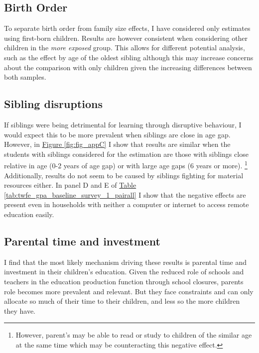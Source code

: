\subsection{Birth Order}

To separate birth order from family size effects, I have considered only estimates using first-born children. Results are however consistent when considering other children in the \textit{more exposed} group. This allows for different potential analysis, such as the effect by age of the oldest sibling although this may increase concerns about the comparison with only children given the increasing differences between both samples.

\subsection{Sibling disruptions}

If siblings were being detrimental for learning through disruptive behaviour, I would expect this to be more prevalent when siblings are close in age gap. However, in \hyperref[fig:fig_appC]{Figure \ref{fig:fig_appC}} I show that results are similar when the students with siblings considered for the estimation are those with siblings close relative in age (0-2 years of age gap) or with large age gaps (6 years or more). \footnote{However, parent's may be able to read or study to children of the similar age at the same time which may be counteracting this negative effect.} Additionally, results do not seem to be caused by siblings fighting for material resources either. In panel D and E of \hyperref[tab:twfe_gpa_baseline_survey_1_pairall]{Table \ref{tab:twfe_gpa_baseline_survey_1_pairall}} I show that the negative effects are present even in households with neither a computer or internet to access remote education easily.





\subsection{Parental time and investment}

I find that the most likely mechanism driving these results is parental time and investment in their children's education. Given the reduced role of schools and teachers in the education production function through school closures, parents role becomes more prevalent and relevant. But they face constraints and can only allocate so much of their time to their children, and less so the more children they have.

